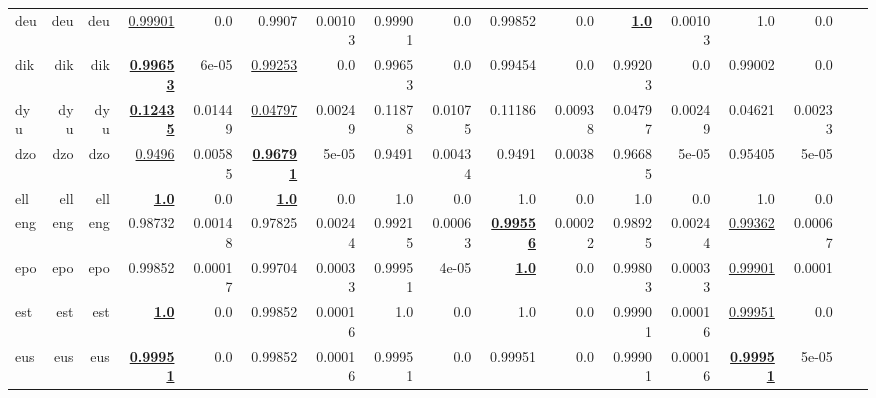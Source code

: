 \documentclass[11pt]{article}
\begin{document}
\begin{table*}[h]
{\begin{tabular}{lrrrrrrrrrrrrrrrr}
deu         & deu         & deu         & \underline{0.99901}         & 0.0         & 0.9907         & 0.00103         & 0.99901         & 0.0         & 0.99852         & 0.0         & \textbf{\underline{1.0}}         & 0.00103         & 1.0         & 0.0         \\
dik         & dik         & dik         & \textbf{\underline{0.99653}}         & 6e-05         & \underline{0.99253}         & 0.0         & 0.99653         & 0.0         & 0.99454         & 0.0         & 0.99203         & 0.0         & 0.99002         & 0.0         \\
dyu         & dyu         & dyu         & \textbf{\underline{0.12435}}         & 0.01449         & \underline{0.04797}         & 0.00249         & 0.11878         & 0.01075         & 0.11186         & 0.00938         & 0.04797         & 0.00249         & 0.04621         & 0.00233         \\
dzo         & dzo         & dzo         & \underline{0.9496}         & 0.00585         & \textbf{\underline{0.96791}}         & 5e-05         & 0.9491         & 0.00434         & 0.9491         & 0.0038         & 0.96685         & 5e-05         & 0.95405         & 5e-05         \\
ell         & ell         & ell         & \textbf{\underline{1.0}}         & 0.0         & \textbf{\underline{1.0}}         & 0.0         & 1.0         & 0.0         & 1.0         & 0.0         & 1.0         & 0.0         & 1.0         & 0.0         \\
eng         & eng         & eng         & 0.98732         & 0.00148         & 0.97825         & 0.00244         & 0.99215         & 0.00063         & \textbf{\underline{0.99556}}         & 0.00022         & 0.98925         & 0.00244         & \underline{0.99362}         & 0.00067         \\
epo         & epo         & epo         & 0.99852         & 0.00017         & 0.99704         & 0.00033         & 0.99951         & 4e-05         & \textbf{\underline{1.0}}         & 0.0         & 0.99803         & 0.00033         & \underline{0.99901}         & 0.0001         \\
est         & est         & est         & \textbf{\underline{1.0}}         & 0.0         & 0.99852         & 0.00016         & 1.0         & 0.0         & 1.0         & 0.0         & 0.99901         & 0.00016         & \underline{0.99951}         & 0.0         \\
eus         & eus         & eus         & \textbf{\underline{0.99951}}         & 0.0         & 0.99852         & 0.00016         & 0.99951         & 0.0         & 0.99951         & 0.0         & 0.99901         & 0.00016         & \textbf{\underline{0.99951}}         & 5e-05         \\

\end{tabular}}
\end{table*}
\end{document}
